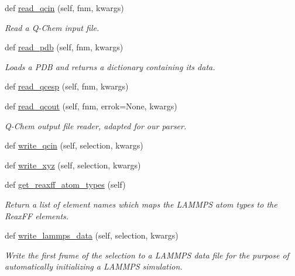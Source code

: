 \begin{DoxyCompactItemize}
def \hyperlink{classsrc_1_1molecule_1_1Molecule_aa9caaf6d7ccff3a9077da98b4c8096a9}{read\+\_\+qcin} (self, fnm, kwargs)
\begin{DoxyCompactList}\small\item\em Read a Q-\/\+Chem input file. \end{DoxyCompactList}\item 
def \hyperlink{classsrc_1_1molecule_1_1Molecule_af52f2ee9f9376925eab6e3309536e011}{read\+\_\+pdb} (self, fnm, kwargs)
\begin{DoxyCompactList}\small\item\em Loads a P\+DB and returns a dictionary containing its data. \end{DoxyCompactList}\item 
def \hyperlink{classsrc_1_1molecule_1_1Molecule_a12369eb306cb29148e610e9ee08d7e2c}{read\+\_\+qcesp} (self, fnm, kwargs)
\item 
def \hyperlink{classsrc_1_1molecule_1_1Molecule_a243cce870c970db8cac7f102325e872b}{read\+\_\+qcout} (self, fnm, errok=None, kwargs)
\begin{DoxyCompactList}\small\item\em Q-\/\+Chem output file reader, adapted for our parser. \end{DoxyCompactList}\item 
def \hyperlink{classsrc_1_1molecule_1_1Molecule_a21d78053aab2fda1fd5e2577a02ec696}{write\+\_\+qcin} (self, selection, kwargs)
\item 
def \hyperlink{classsrc_1_1molecule_1_1Molecule_af42c16177cc7cbfce3c0b2be7b132480}{write\+\_\+xyz} (self, selection, kwargs)
\item 
def \hyperlink{classsrc_1_1molecule_1_1Molecule_a36b472b4d2504123fab8083068f8315a}{get\+\_\+reaxff\+\_\+atom\+\_\+types} (self)
\begin{DoxyCompactList}\small\item\em Return a list of element names which maps the L\+A\+M\+M\+PS atom types to the Reax\+FF elements. \end{DoxyCompactList}\item 
def \hyperlink{classsrc_1_1molecule_1_1Molecule_a7b85106cd6cc8e1d3e7e1ccb4edff551}{write\+\_\+lammps\+\_\+data} (self, selection, kwargs)
\begin{DoxyCompactList}\small\item\em Write the first frame of the selection to a L\+A\+M\+M\+PS data file for the purpose of automatically initializing a L\+A\+M\+M\+PS simulation. \end{DoxyCompactList}\item 

\end{DoxyCompactItemize}
